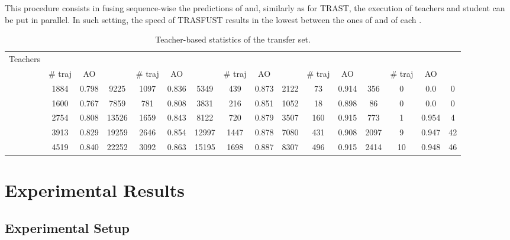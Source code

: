 \documentclass[runningheads]{llncs}
\makeatletter
\def\myalgonamesecond{TRAST\@\xspace}
\def\myalgonamethird{TRASFUST\@\xspace}
\makeatother
\begin{document}
This procedure consists in fusing sequence-wise the predictions of  and, similarly as for \myalgonamesecond, the execution of teachers and student can be put in parallel. In such setting, the speed of \myalgonamethird results in the lowest between the ones of  and of each . 
 



















\begin{table*}[t]
\fontsize{5}{6}\selectfont
\centering
	\caption{Teacher-based statistics of the transfer set.}
	\label{tab:demostats}
\setlength\tabcolsep{.05cm}
\begin{tabular}{l | c c c | c c c | c c c | c c c | c c c }
		\toprule

		Teachers & \multicolumn{3}{c|}{} & \multicolumn{3}{c|}{} & \multicolumn{3}{c|}{} &  \multicolumn{3}{c|}{}  &  \multicolumn{3}{c}{}  \\

		 & \# traj & AO &  & \# traj & AO &   & \# traj & AO &  & \# traj & AO &  & \# traj & AO &  \\
		\midrule
		 & 1884 &	0.798 & 9225 & 1097 & 0.836 & 5349 & 439 & 0.873 & 2122 & 73 & 0.914 & 356 & 0 & 0.0 & 0  \\
		 & 1600 & 0.767 & 7859 & 781 & 0.808 & 3831 & 216 & 0.851 & 1052 & 18 & 0.898 & 86 & 0 & 0.0 & 0  \\
		 & 2754 & 0.808 & 13526 & 1659	& 0.843	& 8122	& 720 & 0.879 & 3507 & 160 & 0.915 & 773 & 1 & 0.954 & 4 \\
		 & 3913 & 0.829 & 19259 & 2646	& 0.854	& 12997	& 1447 & 0.878 & 7080 & 431 & 0.908 & 2097 & 9 & 0.947 & 42  \\
		 & 4519	& 0.840	& 22252	& 3092 & 0.863 & 15195 & 1698 & 0.887 & 8307 & 496 & 0.915 & 2414 & 10 & 0.948 & 46 \\
		\bottomrule		
\end{tabular}
\end{table*} 
\section{Experimental Results}

\subsection{Experimental Setup}
\end{document}
